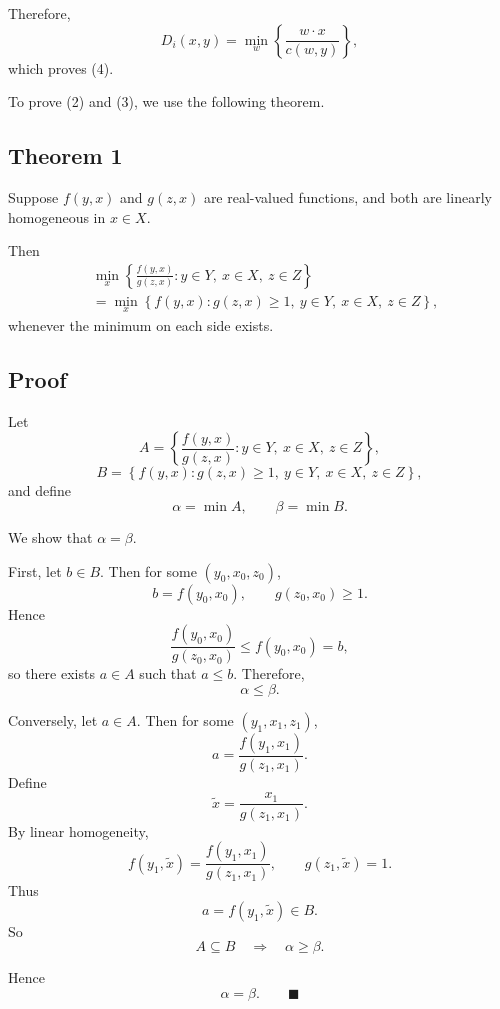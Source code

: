 Therefore,
\[
D_i(x,y)
=
\min_w \left\{ \frac{w\cdot x}{c(w,y)} \right\},
\]
which proves (4).

\medskip

To prove (2) and (3), we use the following theorem.





\begin{tcolorbox}[breakable, colback=white]
\subsection*{Theorem 1}

Suppose $f(y,x)$ and $g(z,x)$ are real-valued functions, and both are
linearly homogeneous in $x\in X$.

Then
\[
\begin{aligned}
&\min_x \left\{
\frac{f(y,x)}{g(z,x)} : y\in Y,\ x\in X,\ z\in Z
\right\}\\
&=
\min_x \left\{
f(y,x) : g(z,x)\ge 1,\ y\in Y,\ x\in X,\ z\in Z
\right\},
\end{aligned}
\]
whenever the minimum on each side exists.

\subsection*{Proof}

Let
\[
A
=
\left\{
\frac{f(y,x)}{g(z,x)} : y\in Y,\ x\in X,\ z\in Z
\right\},
\]
\[
B
=
\left\{
f(y,x) : g(z,x)\ge 1,\ y\in Y,\ x\in X,\ z\in Z
\right\},
\]
and define
\[
\alpha = \min A,
\qquad
\beta = \min B.
\]

We show that $\alpha=\beta$.

\medskip

First, let $b\in B$. Then for some $(y_0,x_0,z_0)$,
\[
b=f(y_0,x_0),
\qquad
g(z_0,x_0)\ge 1.
\]
Hence
\[
\frac{f(y_0,x_0)}{g(z_0,x_0)} \le f(y_0,x_0)=b,
\]
so there exists $a\in A$ such that $a\le b$.
Therefore,
\[
\alpha \le \beta.
\]

\medskip

Conversely, let $a\in A$. Then for some $(y_1,x_1,z_1)$,
\[
a = \frac{f(y_1,x_1)}{g(z_1,x_1)}.
\]
Define
\[
\tilde x = \frac{x_1}{g(z_1,x_1)}.
\]
By linear homogeneity,
\[
f(y_1,\tilde x)
=
\frac{f(y_1,x_1)}{g(z_1,x_1)},
\qquad
g(z_1,\tilde x)=1.
\]
Thus
\[
a=f(y_1,\tilde x)\in B.
\]
So
\[
A \subseteq B
\quad \Rightarrow \quad
\alpha \ge \beta.
\]

Hence
\[
\alpha=\beta.
\qquad \blacksquare
\]

\end{tcolorbox}
\medskip

